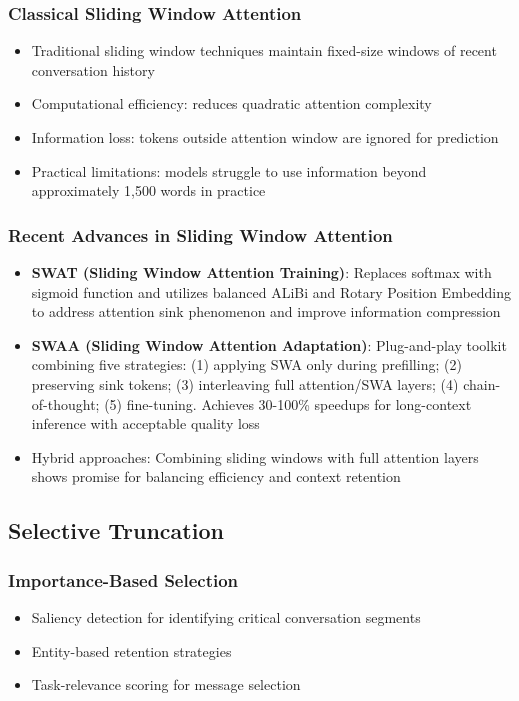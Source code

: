 \documentclass[11pt,letterpaper]{article}
\begin{document}
\subsubsection{Classical Sliding Window Attention}
\begin{itemize}[leftmargin=*]
    \item Traditional sliding window techniques maintain fixed-size windows of recent conversation history
    \item Computational efficiency: reduces quadratic attention complexity
    \item Information loss: tokens outside attention window are ignored for prediction
    \item Practical limitations: models struggle to use information beyond approximately 1,500 words in practice
\end{itemize}

\subsubsection{Recent Advances in Sliding Window Attention}
\begin{itemize}[leftmargin=*]
    \item \textbf{SWAT (Sliding Window Attention Training)}: Replaces softmax with sigmoid function and utilizes balanced ALiBi and Rotary Position Embedding to address attention sink phenomenon and improve information compression
    \item \textbf{SWAA (Sliding Window Attention Adaptation)}: Plug-and-play toolkit combining five strategies: (1) applying SWA only during prefilling; (2) preserving sink tokens; (3) interleaving full attention/SWA layers; (4) chain-of-thought; (5) fine-tuning. Achieves 30-100\% speedups for long-context inference with acceptable quality loss
    \item Hybrid approaches: Combining sliding windows with full attention layers shows promise for balancing efficiency and context retention
\end{itemize}

\subsection{Selective Truncation}

\subsubsection{Importance-Based Selection}
\begin{itemize}[leftmargin=*]
    \item Saliency detection for identifying critical conversation segments
    \item Entity-based retention strategies
    \item Task-relevance scoring for message selection
\end{itemize}
\end{document}
